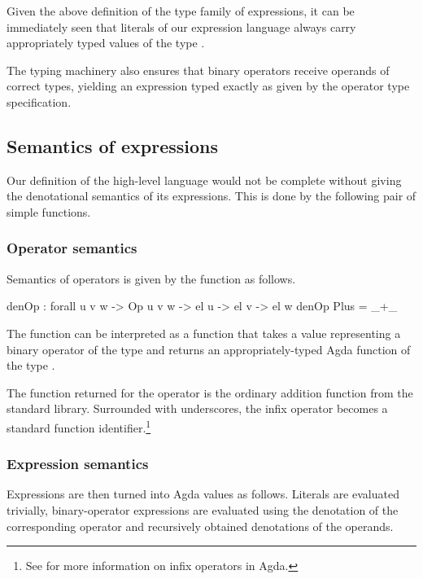 Given the above definition of the type family of expressions, it can be immediately seen that
literals of our expression language always carry appropriately typed values of the
type .

The typing machinery also ensures that binary operators receive operands of correct
types, yielding an expression typed exactly as given by the operator type specification.

\subsection{Semantics of expressions}

Our definition of the high-level language would not be complete without giving
the denotational semantics of its expressions. This is done by the following
pair of simple functions.

\subsubsection{Operator semantics}

Semantics of operators is given by the function  as follows.

\begin{code}
  denOp : forall {u v w} -> Op u v w -> el u -> el v -> el w
  denOp Plus = _+\_
\end{code}

\noindent The function  can be interpreted as a function that takes a value
representing a binary operator of the type  and returns an appropriately-typed Agda
function of the type .

The function returned for the operator  is the ordinary addition function
from the standard library. Surrounded with underscores, the infix operator \ident{+} becomes
a standard function identifier.\footnote{See  for more information on
infix operators in Agda.}

\subsubsection{Expression semantics}

Expressions are then turned into Agda values as follows. Literals are evaluated trivially,
binary-operator expressions are evaluated using the denotation of the corresponding
operator and recursively obtained denotations of the operands.

